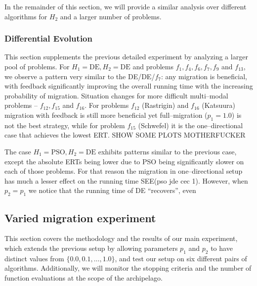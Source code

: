 \documentclass{sig-alternate}
\begin{document}
In the remainder of this section, we will provide a similar analysis over different algorithms for $H_2$ and a larger number of problems.

\subsubsection{Differential Evolution}
This section supplements the previous detailed experiment by analyzing a larger pool of problems.
For $H_1 =\mbox{DE}, H_2=\mbox{DE}$ and problems $f_1, f_4, f_6, f_7, f_9$ and $f_{13}$, we observe a pattern very similar to the DE/DE/$f_7$: any migration is beneficial, with feedback significantly improving the overall running time with the increasing probability of migration.
Situation changes for more difficult multi--modal problems -- $f_{12}, f_{15}$ and $f_{16}$.
For problems $f_{12}$ (Rastrigin) and $f_{16}$ (Katsuura) migration with feedback is still more beneficial yet full--migration ($p_1=1.0$) is not the best strategy, while for problem $f_{15}$ (Schwefel) it is the one--directional case that achieves the lowest ERT.
SHOW SOME PLOTS MOTHERFUCKER

The case $H_1 = \mbox{PSO}, H_2=\mbox{DE}$ exhibits patterns similar to the previous case, except the absolute ERTs being lower due to PSO being significantly slower on each of those problems.
For that reason the migration in one--directional setup has much a lesser effect on the running time SEE(pso jde cec 1).
However, when $p_2 = p_1$ we notice that the running time of DE ``recovers'', even


\subsection{Varied migration experiment}

This section covers the methodology and the results of our main experiment, which extends the previous setup by allowing parameters $p_1$ and $p_2$ to have distinct values from $\{0.0, 0.1, \ldots, 1.0\}$, and test our setup on six different pairs of algorithms.
Additionally, we will monitor the stopping criteria and the number of function evaluations at the scope of the archipelago.
\end{document}
